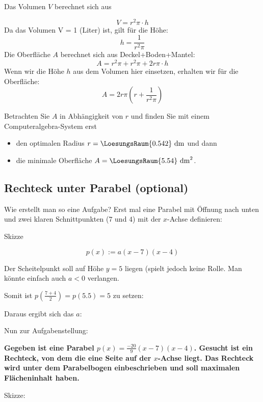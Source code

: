 Das Volumen $V$ berechnet sich aus

$$V = r^2\pi\cdot{}h$$
Da das Volumen V = 1 (Liter) ist, gilt für die Höhe:
$$h = \frac{1}{r^2\pi}$$
Die Oberfläche $A$ berechnet sich aus Deckel+Boden+Mantel:  
$$A=r^2\pi + r^2\pi + 2r\pi\cdot{}h$$
Wenn wir die Höhe $h$ aus dem Volumen hier einsetzen, erhalten wir für die Oberfläche:
$$A=2r\pi\left(r+\frac{1}{r^2\pi}\right)$$

Betrachten Sie $A$ in Abhängigkeit von $r$ und finden Sie mit einem
Computeralgebra-System erst
\begin{itemize}
\item
  den optimalen Radius $r=\LoesungsRaum{0.542} \text{ dm}$ und dann
\item
  die minimale Oberfläche $A= \LoesungsRaum{5.54} \text{ dm}^2$.
\end{itemize}
\newpage

\subsection{Rechteck unter Parabel (optional)}

Wie erstellt man so eine Aufgabe? Erst mal eine Parabel mit Öffnung nach unten und zwei klaren Schnittpunkten (\zB $7$ und $4$) mit der $x$-Achse definieren:

Skizze


$$p(x) := a(x-7)(x-4)$$

Der Scheitelpunkt soll auf Höhe $y=5$ liegen (spielt jedoch keine Rolle. Man könnte einfach auch $a<0$ verlangen.

Somit ist $p(\frac{7+4}2) = p(5.5) = 5$ zu setzen:



Daraus ergibt sich das $a$:

\newpage

Nun zur Aufgabenstellung:

\textbf{Gegeben ist eine Parabel $p(x) = \frac{-20}9(x-7)(x-4)$. Gesucht ist ein Rechteck, von dem die eine Seite auf der $x$-Achse liegt. Das Rechteck wird unter dem Parabelbogen einbeschrieben und soll maximalen Flächeninhalt haben.}

Skizze:


